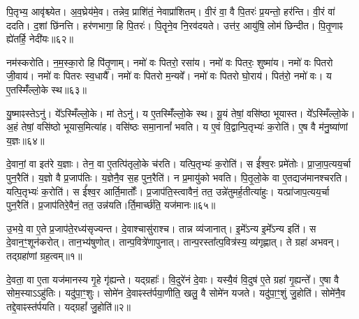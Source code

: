 पि॒तृभ्य॒ आवृ॑श्च्येत।
अ॒व॒घ्रेय॑मे॒व।
तन्नेव॒ प्राशि॑तं॒ नेवाप्रा॑शितम्।
वी॒रं वा॒ वै पि॒तरः॑ प्र॒यन्तो॒ हर॑न्ति।
वी॒रं वा॑ ददति।
द॒शां छि॑नत्ति।
हर॑णभागा॒ हि पि॒तरः॑।
पि॒तॄने॒व नि॒रव॑दयते।
उत्त॑र॒ आयु॑षि॒ लोम॑ छिन्दीत।
पि॒तृ॒णाꣴ ह्ये॑तर्\mbox{}हि॒ नेदी॑यः॥६२॥\ip

नम॑स्करोति।
न॒म॒स्का॒रो हि पि॑तृ॒णाम्।
नमो॑ वः पितरो॒ रसा॑य।
नमो॑ वः पितरः॒ शुष्मा॑य।
नमो॑ वः पितरो जी॒वाय॑।
नमो॑ वः पितरः स्व॒धायै᳚।
नमो॑ वः पितरो म॒न्यवे᳚।
नमो॑ वः पितरो घो॒राय॑।
पित॑रो॒ नमो॑ वः।
य ए॒तस्मिँ॑ल्लो॒के स्थ॥६३॥\ip

यु॒ष्माꣴस्तेऽनु॑।
ये᳚ऽस्मिँल्लो॒के।
मां तेऽनु॑।
य ए॒तस्मिँ॑ल्लो॒के स्थ।
यू॒यं तेषां॒ वसि॑ष्ठा भूयास्त।
ये᳚ऽस्मिँल्लो॒के।
अ॒हं तेषां॒ वसि॑ष्ठो भूयास॒मित्या॑ह।
वसि॑ष्ठः समा॒नानां᳚ भवति।
य ए॒वं वि॒द्वान्पि॒तृभ्यः॑ क॒रोति॑।
ए॒ष वै म॑नु॒ष्या॑णां य॒ज्ञः॥६४॥\ip

दे॒वानां॒ वा इत॑रे य॒ज्ञाः।
तेन॒ वा ए॒तत्पि॑तृलो॒के च॑रति।
यत्पि॒तृभ्यः॑ क॒रोति॑।
स ई᳚श्व॒रः प्रमे॑तोः।
प्रा॒जा॒प॒त्यय॒र्चा पुन॒रैति॑।
य॒ज्ञो वै प्र॒जा\-प॑तिः।
य॒ज्ञेनै॒व स॒ह पुन॒रैति॑।
न प्र॒मायु॑को भवति।
पि॒तृ॒लो॒के वा ए॒तद्यज॑मानश्चरति।
यत्पि॒तृभ्यः॑ क॒रोति॑।
स ई᳚श्व॒र आर्ति॒मार्तोः᳚।
प्र॒जा\-प॑ति॒स्त्वावैनं॒ तत॒ उन्ने॑तुमर्\mbox{}ह॒तीत्या॑हुः।
यत्प्रा॑जाप॒त्यय॒र्चा पुन॒रैति॑।
प्र॒जा\-प॑तिरे॒वैनं॒ तत॒ उन्न॑यति।र्ति॒मार्च्छ॑ति॒ यज॑मानः॥६५॥\ip\anuvakamend[इत्य॑श्ञुते पद्यन्ते पद्यन्ते॒ षड्वा ऋ॒तवो॑ वर्त॒ते\-ऽह॑विः स्या॒न्नेदी॑यः॒ स्थ य॒ज्ञो यज॑मानश्चरति॒ यत्पि॒तृभ्यः॑ क॒रोति॒ पञ्च॑ च]


\clearpage
{}
\setcounter{anuvakam}{0}

उ॒भये॒ वा ए॒ते प्र॒जा\-प॑ते॒रध्य॑सृज्यन्त।
दे॒वाश्चासु॑राश्च।
तान्न व्य॑जानात्।
इ॒मे᳚ऽन्य इ॒मे᳚ऽन्य इति॑।
स दे॒वान॒ꣳ॒शून॑करोत्।
तान॒भ्य॑षुणोत्।
तान्प॒वित्रे॑णापुनात्।
तान्प॒रस्ता᳚त्प॒वित्र॑स्य॒ व्य॑गृह्णात्।
ते ग्रहा॑ अभवन्।
तद्ग्रहा॑णां ग्रह॒त्वम्॥१॥\ip

दे॒वता॒ वा ए॒ता यज॑मानस्य गृ॒हे गृ॑ह्यन्ते।
यद्ग्रहाः᳚।
वि॒दुरे॑नं दे॒वाः।
यस्यै॒वं वि॒दुष॑ ए॒ते ग्रहा॑ गृ॒ह्यन्ते᳚।
ए॒षा वै सोम॒स्या\-ऽऽहु॑तिः।
यदु॑पा॒ꣳ॒शुः।
सोमे॑न दे॒वाꣴस्त॑र्पया॒णीति॒ खलु॒ वै सोमे॑न यजते।
यदु॑पा॒ꣳ॒शुं जु॒होति॑।
सोमे॑नै॒व तद्दे॒वाꣴस्त॑र्पयति।
यद्ग्रहां᳚ जु॒होति॑॥२॥\ip


